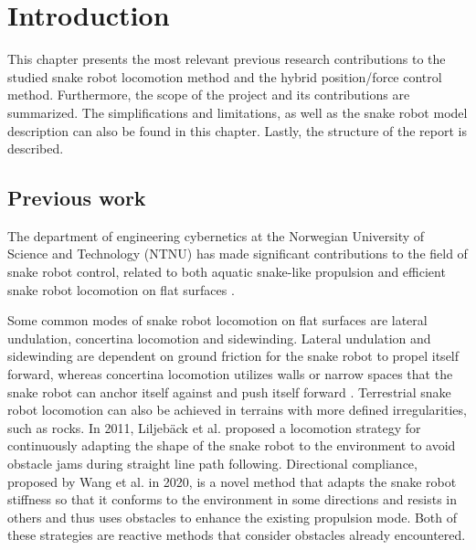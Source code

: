 
\chapter{Introduction}\label{Chapter:introduction}

This chapter presents the most relevant previous research contributions to the studied snake robot locomotion method and the hybrid position/force control method. Furthermore, the scope of the project and its contributions are summarized. The simplifications and limitations, as well as the snake robot model description can also be found in this chapter. Lastly, the structure of the report is described.

\section{Previous work}

The department of engineering cybernetics at the Norwegian University of Science and Technology (NTNU) has made significant contributions to the field of snake robot control, related to both aquatic snake-like propulsion and efficient snake robot locomotion on flat surfaces \cite{StavdahlNote}.

Some common modes of snake robot locomotion on flat surfaces are lateral undulation, concertina locomotion and sidewinding. Lateral undulation and sidewinding are dependent on ground friction for the snake robot to propel itself forward, whereas concertina locomotion utilizes walls or narrow spaces that the snake robot can anchor itself against and push itself forward \cite{liljeback2012snake}. Terrestrial snake robot locomotion can also be achieved in terrains with more defined irregularities, such as rocks. In 2011, Liljebäck et al. \cite{liljeback2011snake} proposed a locomotion strategy for continuously adapting the shape of the snake robot to the environment to avoid obstacle jams during straight line path following. Directional compliance, proposed by Wang et al. \cite{wang2020directional} in 2020, is a novel method that adapts the snake robot stiffness so that it conforms to the environment in some directions and resists in others and thus uses obstacles to enhance the existing propulsion mode. Both of these strategies are reactive methods that consider obstacles already encountered.

